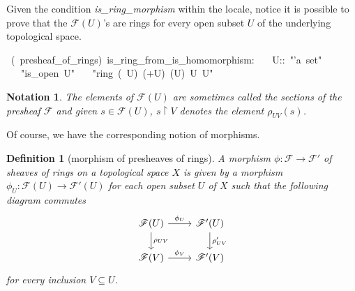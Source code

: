 \documentclass[12pt]{scrartcl}
\newtheorem{definition}[proposition]{Definition}
\newtheorem{notation}{Notation}
\begin{document}
Given the condition \textit{is\_ring\_morphism} within the locale, notice it is possible to prove that the $\mathscr{F}(U)$'s are rings for every open subset $U$ of the underlying topological space.

\begin{isabelle}
\ (\ presheaf\_of\_rings)\ is\_ring\_from\_is\_homomorphism:\isanewline
\ \ \ U::\ "'a\ set"\isanewline
\ \ \ "is\_open\ U"\isanewline
\ \ \ "ring\ (\isasymFF \ U)\ (+\isactrlbsub U\isactrlesub )\ (\isasymcdot \isactrlbsub U\isactrlesub )\ \isasymzero \isactrlbsub U\isactrlesub \ \isasymone \isactrlbsub U\isactrlesub "
\end{isabelle}

\begin{notation}
	The elements of $\mathscr{F}(U)$ are sometimes called the sections of the presheaf $\mathscr{F}$ and given $s \in \mathscr{F}(U)$, $s\restriction V$ denotes the element $\rho_{UV}(s)$.
\end{notation}

Of course, we have the corresponding notion of morphisms.

\begin{definition}[morphism of presheaves of rings]
	A morphism $\phi: \mathscr{F} \rightarrow \mathscr{F}'$ of sheaves of rings on a topological space $X$ is given by a morphism $\phi_U: \mathscr{F}(U) \rightarrow \mathscr{F}'(U)$ for each open subset $U$ of $X$ such that  the following diagram commutes
	\[
	\begin{tikzcd}
	\mathscr{F}(U) \arrow[r, "\phi_U"] \arrow[d, "\rho_{UV}"] & \mathscr{F}'(U) \arrow[d, "\rho'_{UV}"] \\
	\mathscr{F}(V) \arrow[r, "\phi_V"] & \mathscr{F}'(V) 
	\end{tikzcd}
	\]
	for every inclusion $V \subseteq U$.
\end{definition}
\end{document}
